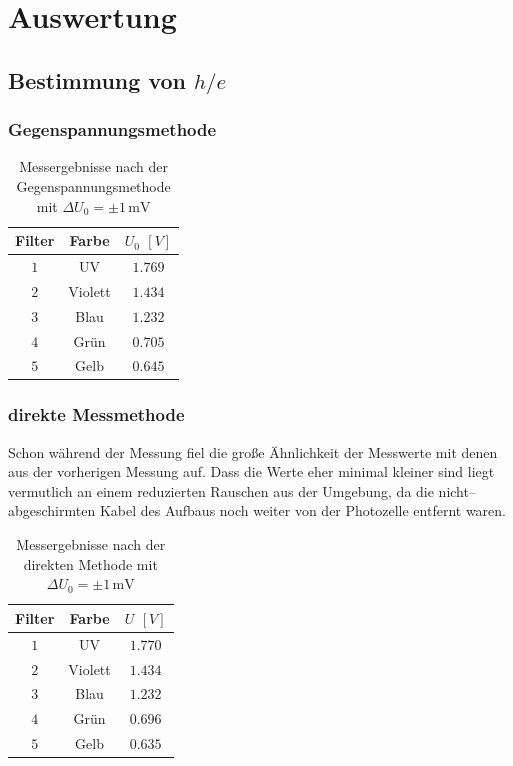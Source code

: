 \documentclass[12pt,a4paper]{scrartcl}
\numberwithin{equation}{section} %
\begin{document}
\clearpage
\hypertarget{auswertung}{\section{Auswertung}\label{auswertung}}
\subsection{Bestimmung von $h/e$}

\subsubsection{Gegenspannungsmethode}

\begin{table}[h!]
	\centering
	\begin{tabular}{c|c|c}
		Filter & Farbe & $U_0$ $[V]$ \\
		\hline
		$1$ & UV & $1.769$ \\
		$2$ & Violett & $1.434$ \\
		$3$ & Blau & $1.232$ \\
		$4$ & Grün & $0.705$ \\
		$5$ & Gelb & $0.645$ \\
	\end{tabular}
	\caption{Messergebnisse nach der Gegenspannungsmethode mit $\Delta U_0=\pm 1\mathrm{\,mV}$}
	\label{tab:Gegenspannungsmethode}
\end{table}

\subsubsection{direkte Messmethode}
Schon während der Messung fiel die große Ähnlichkeit der Messwerte mit denen aus der vorherigen Messung auf. Dass die Werte eher minimal kleiner sind liegt vermutlich an einem reduzierten Rauschen aus der Umgebung, da die nicht--abgeschirmten Kabel des Aufbaus noch weiter von der Photozelle entfernt waren.

\begin{table}[h!]
	\centering
	\begin{tabular}{c|c|c}
		Filter & Farbe & $U$ $[V]$ \\
		\hline
		$1$ & UV & $1.770$ \\
		$2$ & Violett & $1.434$ \\
		$3$ & Blau & $1.232$ \\
		$4$ & Grün & $0.696$ \\
		$5$ & Gelb & $0.635$ \\
	\end{tabular}
	\caption{Messergebnisse nach der direkten Methode mit $\Delta U_0=\pm 1\mathrm{\,mV}$}
	\label{tab:direkten Methode}
\end{table}
\end{document}
